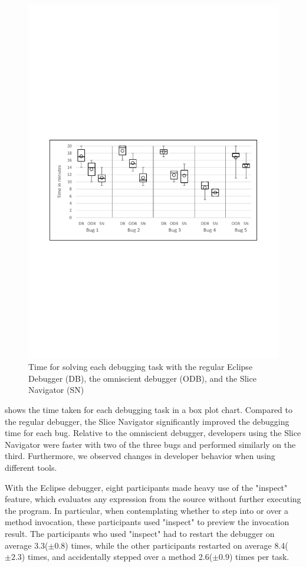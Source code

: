 \begin{figure}
	\centering
		\includegraphics[width=\linewidth]{img/chart-times3.pdf}
	\caption{Time for solving each debugging task with the regular Eclipse Debugger (DB), the omniscient debugger (ODB), and the Slice Navigator (SN)}
	\label{fig:charttimes}
\end{figure}

 shows the time taken for each debugging task in a box plot chart.
Compared to the regular debugger, the Slice Navigator significantly improved the debugging time for each bug.
Relative to the omniscient debugger, developers using the Slice Navigator were faster with two of the three bugs and performed similarly on the third.
Furthermore, we observed changes in developer behavior when using different tools.

With the Eclipse debugger, eight participants made heavy use of the "inspect" feature, which evaluates any expression from the source without further executing the program.
In particular, when contemplating whether to step into or over a method invocation, these participants used "inspect" to preview the invocation result.
The participants who used "inspect" had to restart the debugger on average 3.3($\pm0.8$) times, while the other participants restarted on average 8.4($\pm2.3$) times, and accidentally stepped over a method 2.6($\pm0.9$) times per task.

